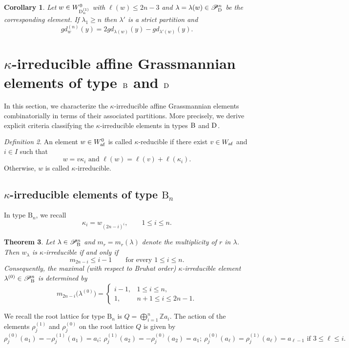 \documentclass[a4paper]{amsart}
\newtheorem{thm}{Theorem}[section]
\newtheorem{cor}[thm]{Corollary}
\theoremstyle{remark}
\newtheorem{defn}[thm]{Definition}
\numberwithin{equation}{section}
\begin{document}
\begin{cor}
Let $w\in W_{\mathrm{D}_{n}^{(1)}}^0$ with $\ell(w)\le 2n-3$ and $\lambda=\lambda(w)\in \mathscr{P}^n_{\mathrm{D}_{}}$ be the corresponding element. If $\lambda_1\ge n$ then $\lambda'$ is a strict partition and
\[ gd_{w}^{(n)}(y)=2gd_{\lambda(w)}(y)-gd_{\lambda'(w)}(y).
\]
\end{cor}






\section{$\kappa$-irreducible affine Grassmannian elements of type $\mathrm{B}_{}$ and $\mathrm{D}_{}$}\label{S:ka_irr_elt}
In this section, we characterize the \(\kappa\)-irreducible affine Grassmannian elements combinatorially in terms of their associated partitions. More precisely, we derive explicit criteria classifying the \(\kappa\)-irreducible elements in types \(\mathrm{B}_{}\) and \(\mathrm{D}_{}\).

\begin{defn} 
An element \(w\in W_{\mathrm{af}}^{0}\) is called \(\kappa\)-reducible if there exist \(v\in W_{\mathrm{af}}\) and \(i\in I\) such that \[ w=v\kappa_i \text{ and } \ell(w)=\ell(v)+\ell(\kappa_i). \] Otherwise, \(w\) is called \(\kappa\)-irreducible. \end{defn}


\subsection{$\kappa$-irreducible elements of type $\mathrm{B}_n$}


In type \(\mathrm{B}_n\), we recall \[ \kappa_i=w_{(2n-i)^i}, \qquad 1\leq i\leq n. \]

\begin{thm}\label{thm:kappa-irr-type-B}
Let \(\lambda\in\mathscr{P}^n_{\mathrm{B}_{}}\) and \(m_r=m_r(\lambda)\) denote the
multiplicity of \(r\) in \(\lambda\). Then \(w_\lambda\) is
\(\kappa\)-irreducible if and only if
\[
m_{2n-i}\leq i-1
\qquad\text{for every }1\leq i\leq n.
\]
Consequently, the maximal (with respect to Bruhat order) \(\kappa\)-irreducible element
\(\lambda^{(0)}\in\mathscr{P}^n_{\mathrm{B}_{}}\) is determined by
\[
m_{2n-i}\bigl(\lambda^{(0)}\bigr)=
\begin{cases}
i-1, & 1\leq i\leq n,\\
1,   & n+1\leq i\leq 2n-1.
\end{cases}
\]
\end{thm}


We recall the root lattice for type $\mathrm{B}_n$ is
$Q=\bigoplus_{i=1}^n \mathbb{Z}a_i$. The action of the elements $\rho_j^{(1)}$ and $\rho_j^{(0)}$ on the root lattice $Q$ is given by
$$\rho_j^{(0)}(a_1)=-\rho_j^{(1)}(a_1)=a_i;~ \rho_j^{(1)}(a_2)=-\rho_j^{(0)}(a_2)=a_1;~\rho_j^{(0)}(a_\ell)=\rho_j^{(1)}(a_\ell)=a_{\ell-1} \text{ if } 3\leq \ell\le i.$$  
\end{document}
